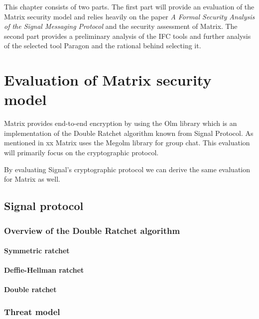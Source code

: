 This chapter consists of two parts. The first part will provide an evaluation of the Matrix security model and relies heavily on the paper \emph{A Formal Security Analysis of the Signal Messaging Protocol} and the security assessment of Matrix. The second part provides a preliminary analysis of the IFC tools and further analysis of the selected tool Paragon and the rational behind selecting it.


\section{Evaluation of Matrix security model}

Matrix provides end-to-end encryption by using the Olm library which is an implementation of the Double Ratchet algorithm known from Signal Protocol. As mentioned in xx Matrix uses the Megolm library for group chat. This evaluation will primarily focus on the cryptographic protocol.

By evaluating Signal's cryptographic protocol we can derive the same evaluation for Matrix as well.  


\subsection{Signal protocol}

\subsubsection{Overview of the Double Ratchet algorithm}

\paragraph{Symmetric ratchet}

\paragraph{Deffie-Hellman ratchet}

\paragraph{Double ratchet}


\subsubsection{Threat model}

